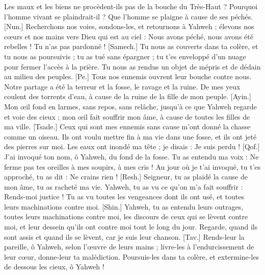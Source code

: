 \begin{multicols}{2}
Les maux et les biens ne procèdent-ils pas de la bouche du Très-Haut ?
Pourquoi l’homme vivant se plaindrait-il ? Que l’homme se plaigne à cause de ses péchés.
[Nun.] Recherchons nos voies, sondons-les, et retournons à Yahweh ;
élevons nos cœurs et nos mains vers Dieu qui est au ciel :
Nous avons péché, nous avons été rebelles ! Tu n’as pas pardonné !
[Samech.] Tu nous as couverts dans ta colère, et tu nous as poursuivis ; tu as tué sans épargner ;
tu t’es enveloppé d'un nuage pour fermer l’accès à la prière.
Tu nous as rendus un objet de mépris et de dédain au milieu des peuples.
[Pe.] Tous nos ennemis ouvrent leur bouche contre nous.
Notre partage a été la terreur et la fosse, le ravage et la ruine.
De mes yeux coulent des torrents d’eau, à cause de la ruine de la fille de mon peuple.
[Ayin.] Mon œil fond en larmes, sans repos, sans relâche,
jusqu’à ce que Yahweh regarde et voie des cieux ;
mon œil fait souffrir mon âme, à cause de toutes les filles de ma ville.
[Tsade.] Ceux qui sont mes ennemis sans cause m’ont donné la chasse comme un oiseau.
Ils ont voulu mettre fin à ma vie dans une fosse, et ils ont jeté des pierres sur moi.
Les eaux ont inondé ma tête ; je disais : Je suis perdu !
[Qof.] J’ai invoqué ton nom, ô Yahweh, du fond de la fosse.
Tu as entendu ma voix : Ne ferme pas tes oreilles à mes soupirs, à mes cris !
Au jour où je t’ai invoqué, tu t'es approché, tu as dit : Ne crains rien !
[Resh.] Seigneur, tu as plaidé la cause de mon âme, tu as racheté ma vie.
Yahweh, tu as vu ce qu’on m'a fait souffrir : Rends-moi justice !
Tu as vu toutes les vengeances dont ils ont usé, et toutes leurs machinations contre moi.
[Shin.] Yahweh, tu as entendu leurs outrages, toutes leurs machinations contre moi,
les discours de ceux qui se lèvent contre moi, et leur dessein qu'ils  ont contre moi tout le long du jour.
Regarde, quand ils sont assis et quand ils se lèvent, car je suis leur chanson.
[Tav.] Rends-leur la pareille, ô Yahweh, selon l’œuvre de leurs mains ;
livre-les à l'endurcissement de leur cœur, donne-leur ta malédiction.
Poursuis-les dans ta colère, et extermine-les de dessous les cieux, ô Yahweh !

\end{multicols}
